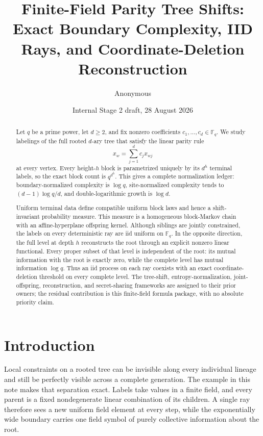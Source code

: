 \documentclass[11pt,a4paper]{amsart}
\title[Finite-field parity tree shifts]{Finite-Field Parity Tree Shifts:\\
Exact Boundary Complexity, IID Rays, and Coordinate-Deletion Reconstruction}
\author{Anonymous}
\date{Internal Stage 2 draft, 28 August 2026}
\theoremstyle{definition}
\theoremstyle{remark}
\newcommand{\F}{\mathbb F}
\begin{document}
\begin{abstract}
Let $q$ be a prime power, let $d\geq2$, and fix nonzero coefficients
$c_1,\ldots,c_d\in\F_q$.  We study labelings of the full rooted $d$-ary
tree that satisfy the linear parity rule
\[
 x_w=\sum_{j=1}^d c_jx_{wj}
\]
at every vertex.  Every height-$h$ block is parametrized uniquely by its
$d^h$ terminal labels, so the exact block count is $q^{d^h}$.  This gives a
complete normalization ledger: boundary-normalized complexity is $\log q$,
site-normalized complexity tends to $(d-1)\log q/d$, and double-logarithmic
growth is $\log d$.

Uniform terminal data define compatible uniform block laws and hence a
shift-invariant probability measure.  This measure is a homogeneous
block-Markov chain with an affine-hyperplane offspring kernel.  Although
siblings are jointly constrained, the labels on every deterministic ray are
iid uniform on $\F_q$.  In the opposite direction, the full level at depth
$h$ reconstructs the root through an explicit nonzero linear functional.
Every proper subset of that level is independent of the root: its mutual
information with the root is exactly zero, while the complete level has
mutual information $\log q$.  Thus an iid process on each ray coexists with
an exact coordinate-deletion threshold on every complete level.  The
tree-shift, entropy-normalization, joint-offspring, reconstruction, and
secret-sharing frameworks are assigned to their prior owners; the residual
contribution is this finite-field formula package, with no absolute priority
claim.
\end{abstract}

\maketitle

\section{Introduction}

Local constraints on a rooted tree can be invisible along every individual
lineage and still be perfectly visible across a complete generation.  The
example in this note makes that separation exact.  Labels take values in a
finite field, and every parent is a fixed nondegenerate linear combination
of its children.  A single ray therefore sees a new uniform field element at
every step, while the exponentially wide boundary carries one field symbol
of purely collective information about the root.
\end{document}
